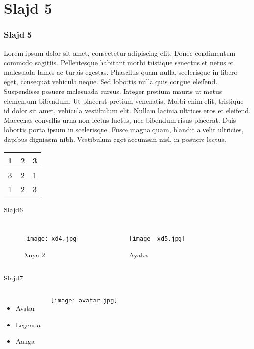 \documentclass{beamer}
\begin{document}
\section{Slajd 5}
	\begin{frame}
 		\frametitle{Slajd 5}
		Lorem ipsum dolor sit amet, consectetur adipiscing elit. Donec condimentum commodo sagittis. Pellentesque habitant morbi tristique senectus et netus et malesuada fames ac turpis egestas. Phasellus quam nulla, scelerisque in libero eget, consequat vehicula neque. Sed lobortis nulla quis congue eleifend. Suspendisse posuere malesuada cursus. Integer pretium mauris ut metus elementum bibendum. Ut placerat pretium venenatis. Morbi enim elit, tristique id dolor sit amet, vehicula vestibulum elit. Nullam lacinia ultrices eros et eleifend. Maecenas convallis urna non lectus luctus, nec bibendum risus placerat. Duis lobortis porta ipsum in scelerisque. Fusce magna quam, blandit a velit ultricies, dapibus dignissim nibh. Vestibulum eget accumsan nisl, in posuere lectus.
		\begin{table}
			\hfill
		\begin{tabular}{|c||c||c|}
			\hline
			1 & 2 & 3 \\ 
			\hline
			3 & 2 & 1\\ 
			\hline
			1 & 2 & 3\\ 
			\hline
		\end{tabular}
		\end{table}
  \end{frame}


\begin{frame}{Slajd6}
	\begin{columns}
		\begin{figure}
			\hspace*{-2cm}
			\texttt{[image: xd4.jpg]}
			\caption{Anya 2}
		\end{figure}
		
		\begin{figure}
			\hspace*{-1cm}
			\texttt{[image: xd5.jpg]}
   			\caption{Ayaka}
			
		\end{figure}
	\end{columns}
\end{frame}


\begin{frame}{Slajd7}
\begin{columns}[T]
	\column{1\textwidth}
	\begin{itemize}
		\item Avatar
		\item Legenda
		\item Aanga
	\end{itemize}
	
	\column{1\textwidth}
	\hspace*{-8cm}
	\texttt{[image: avatar.jpg]}
\end{columns}
\end{frame}
\end{document}
